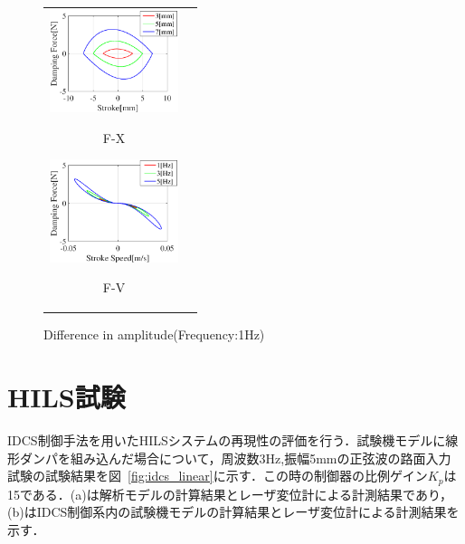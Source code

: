 \documentclass{article_vdlab_sotsuron_youshi}
\begin{document}
\vspace*{3mm}
\begin{figure}[h]
  \begin{tabular}{cc}
  \begin{minipage}{0.5\hsize}
  \begin{center}
    \includegraphics[height=30mm]{figure/damper_fx.eps}
    \end{center}
    \begin{center}
      \vspace{-3mm}
    \ F-X\
    \end{center}
  \end{minipage}
  \begin{minipage}{0.5\hsize}
     \begin{center}
      \includegraphics[height=30mm]{figure/damper_fv.eps}
      \end{center}
      \begin{center}
        \vspace{-3mm}
      \ F-V\
    \end{center}
  \end{minipage}
  \end{tabular}
  \caption{Difference in amplitude(Frequency:1Hz)}
    \label{fig:damper}
\end{figure}

\newpage
\section{HILS試験}

IDCS制御手法を用いたHILSシステムの再現性の評価を行う．試験機モデルに線形ダンパを組み込んだ場合について，周波数3Hz,振幅5mmの正弦波の路面入力試験の試験結果を図~\ref{fig:idcs_linear}に示す．この時の制御器の比例ゲイン$K_p$は15である．(a)は解析モデルの計算結果とレーザ変位計による計測結果であり，(b)はIDCS制御系内の試験機モデルの計算結果とレーザ変位計による計測結果を示す．
\end{document}
